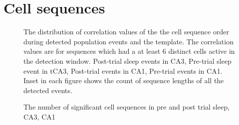 \section{ Cell sequences}
\begin{figure}[H]
\centering
{}
\caption[Template matching analysis]{The distribution of correlation values of the the cell sequence order during detected population events and the template. The correlation values are for sequences which had a at least 6 distinct cells active in the detection window.  Post-trial sleep events in CA3,   Pre-trial sleep event in tCA3,  Post-trial events in CA1,   Pre-trial events in CA1. Inset in each figure shows the count of sequence lengths of all the detected events.}
\label{tmcorr}
\end{figure}
\begin{figure}[H!]
\centering
{}
\subfigure[]{
\label{fig:sf2}
}
\label{pre2post}
\caption{The number of significant cell sequences in pre and post trial sleep,  CA3,  CA1}
\end{figure}
